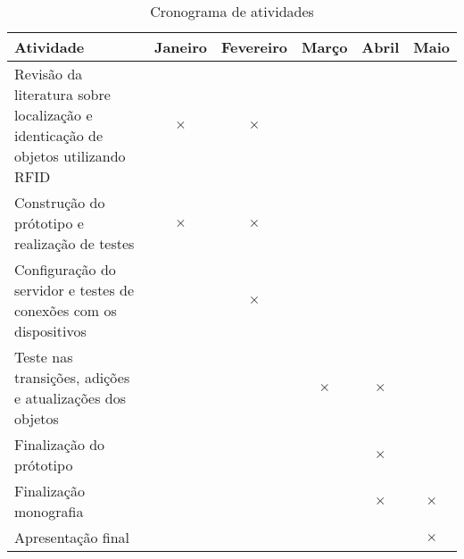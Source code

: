 \label{chapter:cronograma}
\begin{table}[htbp]
  \centering
  \caption{Cronograma de atividades}
  \label{tab:cronograma}
  \begin{tabularx}{\textwidth}{|X|c|c|c|c|c|}
    \hline
    \textbf{Atividade} & \textbf{Janeiro} & \textbf{Fevereiro} & \textbf{Março} & \textbf{Abril} & \textbf{Maio} \\
    \hline
    Revisão da literatura sobre localização e identicação de objetos utilizando RFID & \(\times\) & \(\times\) & & & \\
    \hline
    Construção do prótotipo e realização de testes & \(\times\) &  \(\times\) & & & \\
    \hline
   Configuração do servidor e testes de conexões com os dispositivos & & \(\times\) & & & \\
    \hline
    Teste nas transições, adições e atualizações dos objetos & & & \(\times\) & \(\times\) &  \\
    \hline
    Finalização do prótotipo & & &  & \(\times\) & \\
    \hline
    Finalização monografia & & & & \(\times\) & \(\times\) \\
    \hline
    Apresentação final & & & &  & \(\times\) \\
    \hline
  \end{tabularx}
\end{table}